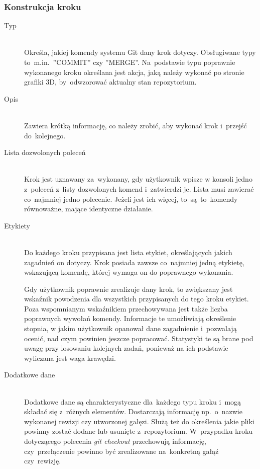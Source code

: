 \documentclass[12pt,a4paper,polish,thesis]{dcsbook}
\begin{document}
{	\subsubsection{Konstrukcja kroku}
	
	\begin{description}
		\item[Typ] \hfill \\
		Określa, jakiej komendy systemu Git dany krok dotyczy. Obsługiwane typy to~m.in.~''COMMIT'' czy ''MERGE''. Na~podstawie typu poprawnie wykonanego kroku określana jest akcja, jaką należy wykonać po stronie grafiki 3D, by~odwzorować aktualny stan repozytorium.
		
		\item[Opis] \hfill \\
		Zawiera krótką informację, co należy zrobić, aby wykonać krok i~przejść do~kolejnego. 
		
		\item[Lista dozwolonych poleceń] \hfill \\
		Krok jest uznawany za~wykonany, gdy użytkownik wpisze w konsoli jedno z~poleceń z~listy dozwolonych komend i~zatwierdzi je. Lista musi zawierać co~najmniej jedno polecenie. Jeżeli jest ich więcej, to~są~to~komendy równoważne, mające identyczne działanie.
		
		\item[Etykiety] \hfill \\
		Do każdego kroku przypisana jest lista etykiet, określających jakich zagadnień on dotyczy. Krok posiada zawsze co~najmniej jedną etykietę, wskazującą komendę, której wymaga on do poprawnego wykonania. 
		
		Gdy użytkownik poprawnie zrealizuje dany krok, to zwiększany jest wskaźnik powodzenia dla wszystkich przypisanych do tego kroku etykiet. Poza wspomnianym wskaźnikiem przechowywana jest także liczba poprawnych wywołań komendy. Informacje te umożliwiają określenie stopnia, w jakim użytkownik opanował dane zagadnienie i~pozwalają ocenić, nad czym powinien jeszcze popracować. Statystyki te są brane pod uwagę przy losowaniu kolejnych zadań, ponieważ na ich podstawie wyliczana jest waga krawędzi.
		
		\item[Dodatkowe dane] \hfill \\
		Dodatkowe dane są charakterystyczne dla~każdego typu kroku i~mogą składać się z~różnych elementów. Dostarczają informację np.~o~nazwie wykonanej rewizji czy utworzonej gałęzi. Służą też do określenia jakie pliki powinny zostać dodane lub usunięte z~repozytorium. W~przypadku kroku dotyczącego polecenia \textit{git checkout} przechowują informację, czy~przełączenie powinno być zrealizowane na~konkretną gałąź czy~rewizję.
	\end{description}

}
\end{document}
